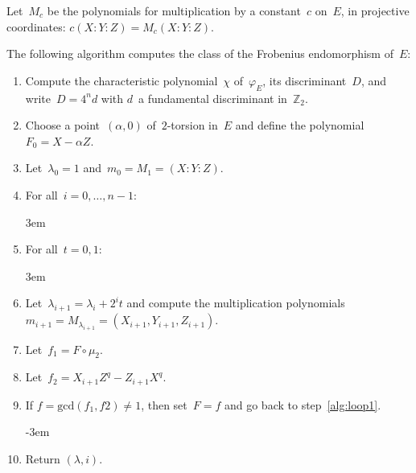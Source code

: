 \documentclass{article}
\begin{document}
Let~$M_c$ be the polynomials for multiplication by a constant~$c$ on~$E$,
in projective coordinates: $c (X:Y:Z) = M_c(X:Y:Z)$.
\begin{prop}
The following algorithm computes the class of the Frobenius endomorphism
of~$E$:
\begin{enumerate}
\def\labelenumi{\arabic{enumi}. }
\itemsep 0pt
\item Compute the characteristic polynomial~$χ$ of~$φ_E$, its
discriminant~$D$, and write~$D = 4^n d$ with $d$~a fundamental
discriminant in~$ℤ_2$.
\item Choose a point~$(α, 0)$ of~$2$-torsion in~$E$ and define the
polynomial~$F_0 = X - α Z$.
\item Let~$λ_0 = 1$ and~$m_0 = M_1 = (X:Y:Z)$.
\item \label{alg:loop1} For all~$i = 0, …, n-1$:
\par\advance \leftskip 3em
\item For all~$t = 0, 1$:
\par\advance \leftskip 3em
\item Let~$λ_{i+1} = λ_i + 2^i t$ and compute the multiplication
polynomials~$m_{i+1} = M_{λ_{i+1}} = (X_{i+1}, Y_{i+1}, Z_{i+1})$.
\item Let~$f_1 = F ∘ μ_2$.
\item Let~$f_2 = X_{i+1} Z^q - Z_{i+1} X^q$.
\item If $f = \mathrm{gcd} (f_1, f2) ≠ 1$, then set~$F = f$ and go back
to step~\ref{alg:loop1}.
\par\advance \leftskip -3em
\item Return $(λ, i)$.
\end{enumerate}
\end{prop}
\end{document}

